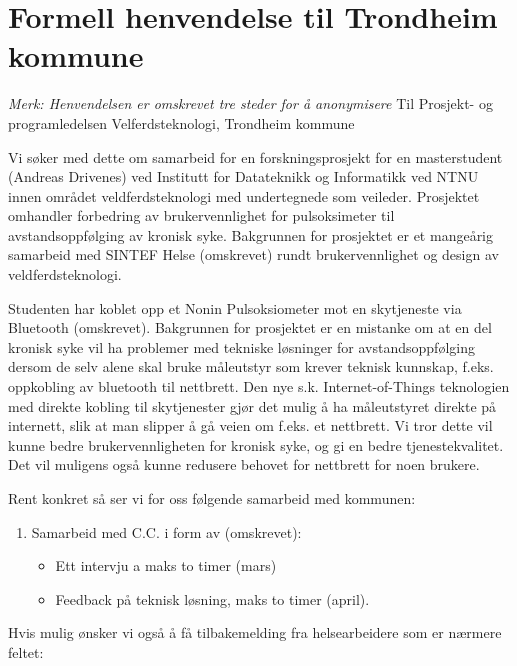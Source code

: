 \chapter{Formell henvendelse til Trondheim kommune}
\label{appendix:formell}
\textit{Merk: Henvendelsen er omskrevet tre steder for å anonymisere}\newline
Til Prosjekt- og programledelsen Velferdsteknologi, Trondheim kommune

Vi søker med dette om samarbeid for en forskningsprosjekt for en masterstudent (Andreas Drivenes) ved Institutt for Datateknikk og Informatikk ved
NTNU innen området veldferdsteknologi med undertegnede som veileder. Prosjektet omhandler forbedring av brukervennlighet for pulsoksimeter til
avstandsoppfølging av kronisk syke. Bakgrunnen for prosjektet er et mangeårig samarbeid med SINTEF Helse (omskrevet) rundt brukervennlighet og
design av veldferdsteknologi.

Studenten har koblet opp et Nonin Pulsoksiometer mot en skytjeneste via
Bluetooth (omskrevet). Bakgrunnen for prosjektet er en mistanke om at en del kronisk syke vil ha problemer med tekniske løsninger for avstandsoppfølging dersom
de selv alene skal bruke måleutstyr som krever teknisk kunnskap, f.eks. oppkobling av bluetooth til nettbrett. Den nye s.k. Internet-of-Things
teknologien med direkte kobling til skytjenester gjør det mulig å ha måleutstyret direkte på internett, slik at man slipper å gå veien om f.eks. et
nettbrett. Vi tror dette vil kunne bedre brukervennligheten for kronisk syke, og gi en bedre tjenestekvalitet. Det vil muligens også kunne redusere
behovet for nettbrett for noen brukere.

Rent konkret så ser vi for oss følgende samarbeid med kommunen:

\begin{enumerate}
\def\labelenumi{\arabic{enumi}.}
\tightlist
\item
    Samarbeid med C.C. i form av (omskrevet):

  \begin{itemize}
  \tightlist
  \item
    Ett intervju a maks to timer (mars)
  \item
    Feedback på teknisk løsning, maks to timer (april).
  \end{itemize}
\end{enumerate}

Hvis mulig ønsker vi også å få tilbakemelding fra helsearbeidere som er
nærmere feltet:

